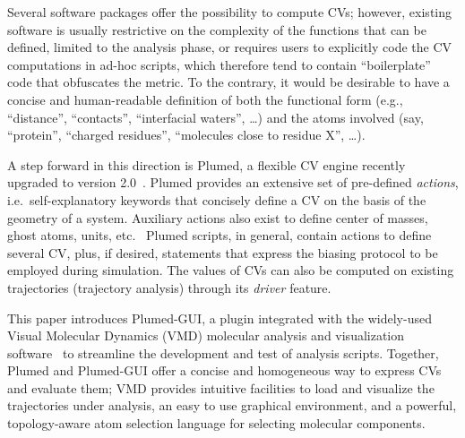\documentclass[preprint,review,11pt]{elsarticle}
\begin{document}
Several software packages offer the possibility to compute CVs;
however, existing software is usually restrictive on the complexity of
the functions that can be defined, limited to the analysis phase, or
requires users to explicitly code the CV computations in ad-hoc
scripts, which therefore tend to contain ``boilerplate'' code that
obfuscates the metric. To the contrary, it would be desirable to have
a concise and human-readable definition of both the functional form
(e.g., ``distance'', ``contacts'', ``interfacial waters'', \dots) and
 the atoms involved (say, ``protein'', ``charged residues'',
``molecules close to residue X'', \dots).

A step forward in this direction is Plumed, a flexible CV engine
recently upgraded to version 2.0~\cite{plumed2_this}. Plumed provides
an extensive set of pre-defined \emph{actions}, i.e.\ self-explanatory
keywords that concisely define a CV on the basis of the geometry of a
system. Auxiliary actions also exist to define center of masses, ghost
atoms, units, etc.~\cite{plumed_manual,bonomi_plumed:_2009}
Plumed scripts, in general, contain actions to define several CV,
plus, if desired, statements that express the biasing protocol to be
employed during simulation. The values of CVs can also
be computed on existing trajectories (trajectory analysis) through
its \emph{driver}  feature.

This paper introduces Plumed-GUI, a plugin integrated with the
widely-used Visual Molecular Dynamics (VMD) molecular analysis and
visualization software~\cite{Humphrey_Dalke_Schulten_1996} to
streamline the development and test of analysis scripts.  Together,
Plumed and Plumed-GUI offer a concise and homogeneous way to express
CVs and evaluate them; VMD provides intuitive facilities to load and
visualize the trajectories under analysis, an easy to use graphical
environment, and a powerful, topology-aware atom selection language
for selecting molecular components.







\end{document}
